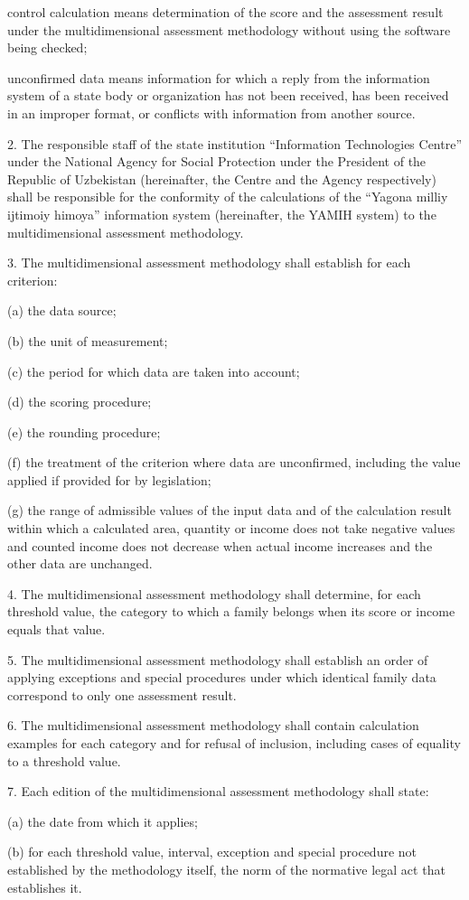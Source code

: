 \documentclass[14pt,a4paper]{extarticle}
\newcommand{\norm}[1]{\par\noindent\hspace*{1.27cm}#1. }
\newcommand{\sub}[1]{\par\noindent\hspace*{1.27cm}#1 }
\begin{document}
control calculation means determination of the score and the assessment result under the multidimensional assessment methodology without using the software being checked;

unconfirmed data means information for which a reply from the information system of a state body or organization has not been received, has been received in an improper format, or conflicts with information from another source.

\norm{2}The responsible staff of the state institution “Information Technologies Centre” under the National Agency for Social Protection under the President of the Republic of Uzbekistan (hereinafter, the Centre and the Agency respectively) shall be responsible for the conformity of the calculations of the “Yagona milliy ijtimoiy himoya” information system (hereinafter, the YAMIH system) to the multidimensional assessment methodology.

\norm{3}The multidimensional assessment methodology shall establish for each criterion:
\sub{(a)}the data source;
\sub{(b)}the unit of measurement;
\sub{(c)}the period for which data are taken into account;
\sub{(d)}the scoring procedure;
\sub{(e)}the rounding procedure;
\sub{(f)}the treatment of the criterion where data are unconfirmed, including the value applied if provided for by legislation;
\sub{(g)}the range of admissible values of the input data and of the calculation result within which a calculated area, quantity or income does not take negative values and counted income does not decrease when actual income increases and the other data are unchanged.

\norm{4}The multidimensional assessment methodology shall determine, for each threshold value, the category to which a family belongs when its score or income equals that value.

\norm{5}The multidimensional assessment methodology shall establish an order of applying exceptions and special procedures under which identical family data correspond to only one assessment result.

\norm{6}The multidimensional assessment methodology shall contain calculation examples for each category and for refusal of inclusion, including cases of equality to a threshold value.

\norm{7}Each edition of the multidimensional assessment methodology shall state:
\sub{(a)}the date from which it applies;
\sub{(b)}for each threshold value, interval, exception and special procedure not established by the methodology itself, the norm of the normative legal act that establishes it.
\end{document}
